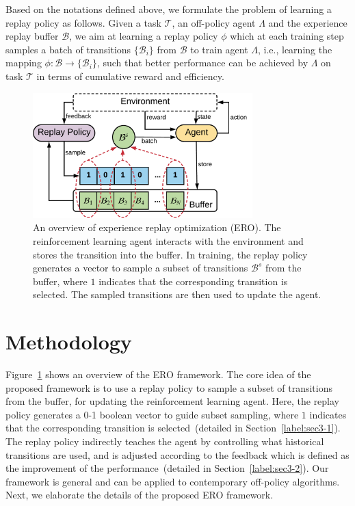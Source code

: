 \documentclass{article}
\begin{document}
Based on the notations defined above, we formulate the problem of learning a replay policy as follows. Given a task $\mathcal{T}$, an off-policy agent $\Lambda$ and the experience replay buffer $\mathcal{B}$, we aim at learning a replay policy $\phi$ which at each training step samples a batch of transitions $\{\mathcal{B}_i\}$ from $\mathcal{B}$ to train agent $\Lambda$, i.e., learning the mapping $\phi:\mathcal{B} \to \{\mathcal{B}_i\}$, such that better performance can be achieved by $\Lambda$ on task $\mathcal{T}$ in terms of cumulative reward and efficiency.

\begin{figure}[t]
\centering
\includegraphics[width=8.5cm]{fig1.pdf}
\caption{An overview of experience replay optimization (ERO). The reinforcement learning agent interacts with the environment and stores the transition into the buffer. In training, the replay policy generates a vector to sample a subset of transitions $\mathcal{B}^s$ from the buffer, where $1$ indicates that the corresponding transition is selected. The sampled transitions are then used to update the agent.}
\label{label:fig1}
\end{figure}

\section{Methodology}
 
Figure~\ref{label:fig1} shows an overview of the ERO framework. The core idea of the proposed framework is to use a replay policy to sample a subset of transitions from the buffer, for updating the reinforcement learning agent. Here, the replay policy generates a 0-1 boolean vector to guide subset sampling, where $1$ indicates that the corresponding transition is selected~(detailed in Section~\ref{label:sec3-1}). The replay policy indirectly teaches the agent by controlling what historical transitions are used, and is adjusted according to the feedback which is defined as the improvement of the performance~(detailed in Section~\ref{label:sec3-2}). Our framework is general and can be applied to contemporary off-policy algorithms. Next, we elaborate the details of the proposed ERO framework.
\end{document}

